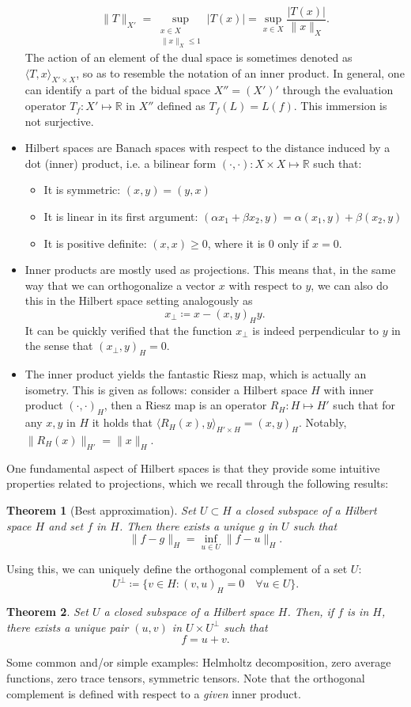 \documentclass{article}
\newcommand{\R}{\mathbb{R}}
\newtheorem{theorem}{Theorem}
\begin{document}
\begin{itemize}
            $$\|T\|_{X'} = \sup_{\substack{x\in X\\ \|x\|_X\leq 1}} |T(x)|= \sup_{x\in X}\frac{|T(x)|}{\|x\|_X}.$$
        The action of an element of the dual space is sometimes denoted as $\langle T, x\rangle_{X'\times X}$, so as to resemble the notation of an inner product. In general, one can identify a part of the bidual space $X'' = (X')'$ through the evaluation operator $T_f:X'\mapsto \R$ in $X''$ defined as $T_f(L) = L(f)$. This immersion is not surjective. 
        \item Hilbert spaces are Banach spaces with respect to the distance induced by a dot (inner) product, i.e. a bilinear form $(\cdot, \cdot ): X\times X\mapsto \R $ such that: 
            \begin{itemize}
                \item It is symmetric: $( x,y) = ( y, x)$
                \item It is linear in its first argument: $(\alpha x_1 + \beta x_2, y)=\alpha( x_1, y) + \beta( x_2, y)$
                \item It is positive definite: $(x,x)\geq 0$, where it is 0 only if $x=0$.
            \end{itemize}
        \item Inner products are mostly used as projections. This means that, in the same way that we can orthogonalize a vector $x$ with respect to $y$, we can also do this in the Hilbert space setting analogously as 
            $$ x_\perp \coloneqq x - (x, y)_H y. $$
        It can be quickly verified that the function $x_\perp$ is indeed perpendicular to $y$ in the sense that $(x_\perp, y)_H=0$. 
        \item The inner product yields the fantastic Riesz map, which is actually an isometry. This is given as follows: consider a Hilbert space $H$ with inner product $(\cdot, \cdot)_H$, then a Riesz map is an operator $R_H: H\mapsto H'$ such that for any $x,y$ in $H$ it holds that $\langle R_H(x), y\rangle_{H'\times H} = (x, y)_H$. Notably, $\|R_H(x)\|_{H'} = \| x \|_H$. 
    \end{itemize}
One fundamental aspect of Hilbert spaces is that they provide some intuitive properties related to projections, which we recall through the following results: 
\begin{theorem}[Best approximation]
    Set $U\subset H$ a closed subspace of a Hilbert space $H$ and set $f$ in $H$. Then there exists a unique $g$ in $U$ such that
        $$ \|f - g \|_H = \inf_{u\in U} \| f - u\|_H. $$
\end{theorem}
Using this, we can uniquely define the orthogonal complement of a set $U$: 
    $$ U^\perp \coloneqq \{v\in H: (v, u)_H = 0 \quad\forall u\in U\}. $$
\begin{theorem}
    Set $U$ a closed subspace of a Hilbert space $H$. Then, if $f$ is in $H$, there exists a unique pair $(u,v)$ in $U\times U^\perp$ such that 
        $$f = u + v.$$
\end{theorem}
Some common and/or simple examples: Helmholtz decomposition, zero average functions, zero trace tensors, symmetric tensors. Note that the orthogonal complement is defined with respect to a \emph{given} inner product.
\end{document}
